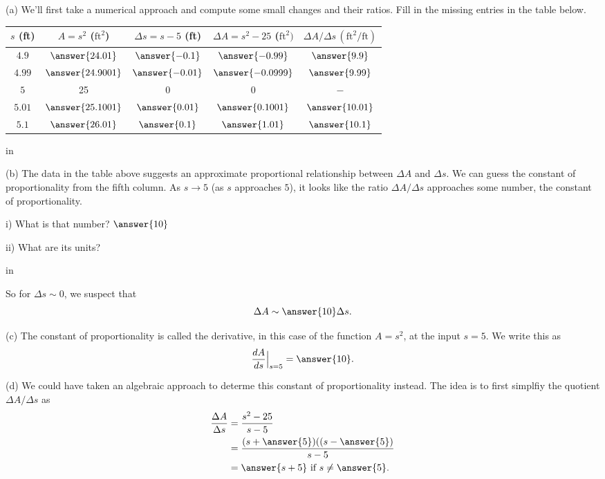 \documentclass{ximera}
\newcommand{\pskip}{\vskip 0.1 in}
\begin{document}
\begin{question}  \label{Qfrdsft4t4tt}
(a) We'll first take a numerical approach and compute some small changes and their ratios. Fill in the missing entries in the table below.

\begin{center}
  \begin{tabular}{ | c| c | c | c | c |}
    \hline
    $s$ (ft) & $A = s^2$ ($\text{ft}^2$) & $\Delta s = s-5$ (ft)  & $\Delta A = s^2 - 25$ ($\text{ft}^2)$ & $\Delta A/\Delta s \, (\text{ft}^2/\text{ft})$ \\ \hline
    $4.9$ & $\answer{24.01}$ & $\answer{-0.1}$ &  $\answer{-0.99}$ & $\answer{9.9}$ \\ \hline
    $4.99$ & $\answer{24.9001}$ & $\answer{-0.01}$ &  $\answer{-0.0999}$ & $\answer{9.99}$ \\ \hline
    $5$  &  25 & $0$ & $0$ & $-$  \\ \hline
    $5.01$ & $\answer{25.1001}$ & $\answer{0.01}$ &  $\answer{0.1001}$ & $\answer{10.01}$ \\ \hline
    $5.1$ & $\answer{26.01}$ & $\answer{0.1}$ &  $\answer{1.01}$ & $\answer{10.1}$ \\ \hline
    \hline
  \end{tabular}
\end{center}

\pskip

(b) The data in the table above suggests an approximate proportional relationship between $\Delta A$ and $\Delta s$. We can guess the constant of proportionality from the fifth column. As $s\to 5$ (as $s$ approaches $5$), it looks like the ratio $\Delta A/\Delta s$ approaches some number, the constant of proportionality.

i) What is that number? $\answer{10}$

ii) What are its units?
\begin{freeResponse}
\end{freeResponse}

\pskip

So for $\Delta s \sim 0$, we suspect that
\[
   \Delta A \sim \answer{10} \Delta s .
\]

(c) The constant of proportionality is called the derivative, in this case of the function $A=s^2$, at the input $s=5$. We write this as
\[
   \frac{dA}{ds}\Big|_{s=5} = \answer{10} .
\]

(d) We could have taken an algebraic approach to determe this constant of proportionality instead. The idea is to first simplfiy the quotient $\Delta A/\Delta s$ as
\begin{align*}
            \frac{\Delta A}{\Delta s} &= \frac{s^2-25}{s-5}  \\
                                                &= \frac{(s + \answer{5})((s - \answer{5})}{s-5} \\
                                               &= \answer{s+5} \text{ if } s\neq {\answer{5}} .
\end{align*}


\end{question}
\end{document}
